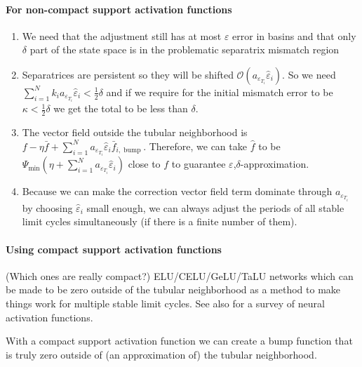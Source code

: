 \documentclass{article}
\newcommand{\ascomment}[1]{\textcolor{ascolor}{(#1)}}
\theoremstyle{definition} \newtheorem{definition}{Definition}
\theoremstyle{remark} \newtheorem{remark}{Remark}
\newcounter{ct}
\begin{document}
\paragraph{For non-compact support activation functions}
\begin{enumerate}
\item We need that the adjustment still has at most $\varepsilon$ error in basins and that only $\delta$ part of the state space is in the problematic separatrix mismatch region
\item Separatrices are persistent so they will be shifted $\mathcal{O}(a_{\varepsilon_{T_i}}\hat \varepsilon_i)$. So we need $\sum_{i=1}^{N}k_i a_{\varepsilon_{T_i}}\hat \varepsilon_i < \tfrac{1}{2}\delta$ and if we require for the initial mismatch error to be $\kappa<\tfrac{1}{2}\delta$ we get the total to be less than $\delta$. 
\item The vector field outside the tubular neighborhood is $f - \eta\bar f  + \sum_{i=1}^Na_{\varepsilon_{T_i}}\hat \varepsilon_i\bar f_{i,\operatorname{bump}}$. 
Therefore, we can take $\hat f$ to be  $\Psi_{\min}(\eta + \sum_{i=1}^Na_{\varepsilon_{T_i}}\hat \varepsilon_i)$ close to $f$ to guarantee $\varepsilon$,$\delta$-approximation.
\item Because we can make the correction vector field term dominate through $a_{\varepsilon_{T_i}}$ by choosing $\hat \varepsilon_i$ small enough, we can always adjust the periods of all stable limit cycles simultaneously (if there is a finite number of them).
\end{enumerate}

\paragraph{Using compact support activation functions}
\ascomment{Which ones are really compact?}
 ELU/CELU/GeLU/TaLU networks\citep{clevert2015elu,barron2017celu,elfwing2018sigmoid,hasan2023talu} which can be made to be zero outside of the tubular neighborhood as a method to make things work for multiple stable limit cycles.
See also \citep{duch1999survey,dubey2022activation,jagtap2023activation,ramachandran2017activation,hayou2019activation} for a survey of neural activation functions.

With a compact support activation function we can create a bump function that is truly zero outside of (an approximation of) the tubular neighborhood.
\end{document}
